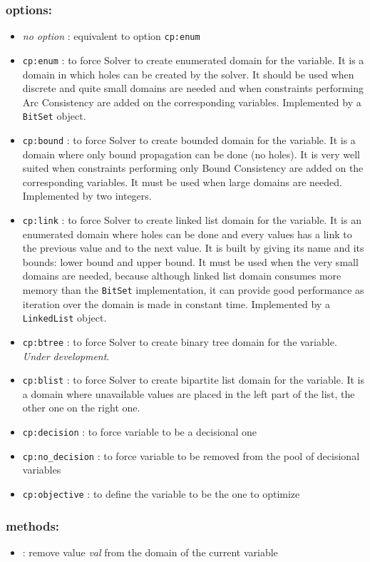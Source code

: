 \subsubsection{options:}
	\begin{itemize}
		\item \emph{no option} : equivalent to option \texttt{cp:enum}
		\item \texttt{cp:enum} : to force Solver to create enumerated domain for the variable. It is a domain in which holes can be created by the solver. It should be used when discrete and quite small domains are needed and when constraints performing Arc Consistency are added on the corresponding variables. Implemented by a \texttt{BitSet} object.
		\item \texttt{cp:bound} : to force Solver to create bounded domain for the variable. It is a domain where only bound propagation can be done (no holes). It is very well suited when constraints performing only Bound Consistency are added on the corresponding variables. It must be used when large domains are needed. Implemented by two integers.
		\item \texttt{cp:link} : to force Solver to create linked list domain for the variable. It is an enumerated domain where holes can be done and every values has a link to the previous value and to the next value. It is built by giving its name and its bounds: lower bound and upper bound. It must be used when the very small domains are needed, because although linked list domain consumes more memory than the \texttt{BitSet} implementation, it can provide good performance as iteration over the domain is made in constant time. Implemented by a \texttt{LinkedList} object.
		\item \texttt{cp:btree} : to force Solver to create binary tree domain for the variable. \emph{Under development}.
		\item \texttt{cp:blist} : to force Solver to create bipartite list domain for the variable. It is a domain where unavailable values are placed in the left part of the list, the other one on the right one.
		\item \texttt{cp:decision} : to force variable to be a decisional one
		\item \texttt{cp:no\_decision} : to force variable to be removed from the pool of decisional variables
		\item \texttt{cp:objective} : to define the variable to be the one to optimize
	\end{itemize}
\subsubsection{methods:}
      \begin{itemize}
      \item {}: remove value \emph{val} from the domain of the current variable
      \end{itemize}

